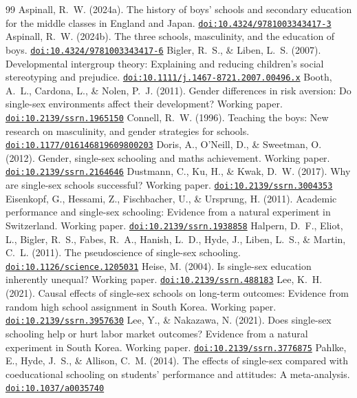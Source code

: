 \documentclass[11pt]{article}
\providecommand{\doi}[1]{\href{https://doi.org/#1}{\nolinkurl{doi:#1}}}
\begin{document}
\begin{thebibliography}{99}
 Aspinall, R.~W. (2024a). The history of boys' schools and secondary education for the middle classes in England and Japan. \doi{10.4324/9781003343417-3}
 Aspinall, R.~W. (2024b). The three schools, masculinity, and the education of boys. \doi{10.4324/9781003343417-6}
 Bigler, R.~S., \& Liben, L.~S. (2007). Developmental intergroup theory: Explaining and reducing children's social stereotyping and prejudice. \doi{10.1111/j.1467-8721.2007.00496.x}
 Booth, A.~L., Cardona, L., \& Nolen, P.~J. (2011). Gender differences in risk aversion: Do single-sex environments affect their development? Working paper. \doi{10.2139/ssrn.1965150}
 Connell, R.~W. (1996). Teaching the boys: New research on masculinity, and gender strategies for schools. \doi{10.1177/016146819609800203}
 Doris, A., O'Neill, D., \& Sweetman, O. (2012). Gender, single-sex schooling and maths achievement. Working paper. \doi{10.2139/ssrn.2164646}
 Dustmann, C., Ku, H., \& Kwak, D.~W. (2017). Why are single-sex schools successful? Working paper. \doi{10.2139/ssrn.3004353}
 Eisenkopf, G., Hessami, Z., Fischbacher, U., \& Ursprung, H. (2011). Academic performance and single-sex schooling: Evidence from a natural experiment in Switzerland. Working paper. \doi{10.2139/ssrn.1938858}
 Halpern, D.~F., Eliot, L., Bigler, R.~S., Fabes, R.~A., Hanish, L.~D., Hyde, J., Liben, L.~S., \& Martin, C.~L. (2011). The pseudoscience of single-sex schooling. \doi{10.1126/science.1205031}
 Heise, M. (2004). Is single-sex education inherently unequal? Working paper. \doi{10.2139/ssrn.488183}
 Lee, K.~H. (2021). Causal effects of single-sex schools on long-term outcomes: Evidence from random high school assignment in South Korea. Working paper. \doi{10.2139/ssrn.3957630}
 Lee, Y., \& Nakazawa, N. (2021). Does single-sex schooling help or hurt labor market outcomes? Evidence from a natural experiment in South Korea. Working paper. \doi{10.2139/ssrn.3776875}
 Pahlke, E., Hyde, J.~S., \& Allison, C.~M. (2014). The effects of single-sex compared with coeducational schooling on students' performance and attitudes: A meta-analysis. \doi{10.1037/a0035740}

\end{thebibliography}
\end{document}
